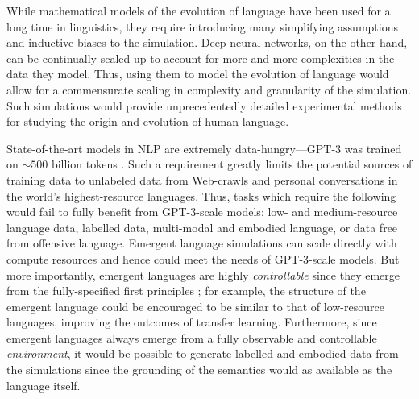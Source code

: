 While mathematical models of the evolution of language have been used for a long time in linguistics, they require introducing many simplifying assumptions and inductive biases to the simulation.
Deep neural networks, on the other hand, can be continually scaled up to account for more and more complexities in the data they model.
Thus, using them to model the evolution of language would allow for a commensurate scaling in complexity and granularity of the simulation.
Such simulations would provide unprecedentedly  detailed experimental methods for studying the origin and evolution of human language.

State-of-the-art models in NLP are extremely data-hungry---GPT-3 was trained on ${\sim}500$ billion tokens \citep{brown2020language}.
Such a requirement greatly limits the potential sources of training data to unlabeled data from Web-crawls and personal conversations in the world's highest-resource languages.
Thus, tasks which require the following would fail to fully benefit from GPT-3-scale models:
    low- and medium-resource language data,
    labelled data,
    multi-modal and embodied language,
    or data free from offensive language.
Emergent language simulations can scale directly with compute resources and hence could meet the needs of GPT-3-scale models.
But more importantly, emergent languages are highly \emph{controllable} since they emerge from the fully-specified first principles ; for example, the structure of the emergent language could be encouraged to be similar to that of low-resource languages, improving the outcomes of transfer learning.
Furthermore, since emergent languages always emerge from a fully observable and controllable \emph{environment}, it would be possible to generate labelled and embodied data from the simulations since the grounding of the semantics would as available  as the language itself.


